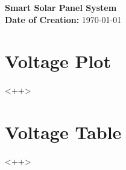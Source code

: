 \documentclass[final, hidelinks, 12pt, a4paper]{article}
\begin{document}
    \begin{titlepage}
        \begin{center}
        	\vspace{1cm}
            {\LARGE{\bfseries Smart Solar Panel System}}\\

            \vspace{15cm}
            {\bfseries Date of Creation:} \today\\
    	\end{center}
    \end{titlepage} 


    \tableofcontents
    \clearpage

    \listoftables
    \clearpage
    
    \listoffigures
    \clearpage



    \pagestyle{fancy}
    \cfoot{}



    \section{Voltage Plot}
    \label{sct:vplot}
    <++>
    \clearpage
    \section{Voltage Table}
    \label{sct:vtable}
    <++>
    \clearpage
    \clearpage

    \printglossaries
    \glsaddallunused
    \clearpage
   

    \printbibliography
    \clearpage


    \noappendicestocpagenum
    \addappheadtotoc

\end{document}
